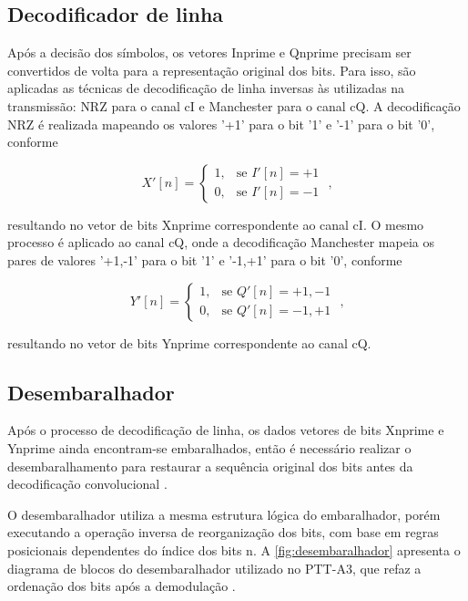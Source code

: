 \subsection{Decodificador de linha}

Após a decisão dos símbolos, os vetores \gls{Inprime} e \gls{Qnprime} precisam ser convertidos de volta para a representação original dos bits. Para isso, são aplicadas as técnicas de decodificação de linha inversas às utilizadas na transmissão: \gls{NRZ} para o canal \gls{cI} e \gls{Manchester} para o canal \gls{cQ}. A decodificação \gls{NRZ} é realizada mapeando os valores '+1' para o bit '1' e '-1' para o bit '0', conforme

\begin{equation}
    X'[n] = 
    \begin{cases}
    1, & \text{se } I'[n] = +1 \\
    0, & \text{se } I'[n] = -1
    \end{cases} \text{ ,}
\end{equation}


\noindent resultando no vetor de bits \gls{Xnprime} correspondente ao canal \gls{cI}. O mesmo processo é aplicado ao canal \gls{cQ}, onde a decodificação \gls{Manchester} mapeia os pares de valores '+1,-1' para o bit '1' e '-1,+1' para o bit '0', conforme

\begin{equation}
    Y'[n] = 
    \begin{cases}
    1, & \text{se } Q'[n] = +1,-1 \\
    0, & \text{se } Q'[n] = -1,+1
    \end{cases} \text{ ,}
\end{equation}

\noindent resultando no vetor de bits \gls{Ynprime} correspondente ao canal \gls{cQ}. 

\subsection{Desembaralhador}

Após o processo de decodificação de linha, os dados vetores de bits \gls{Xnprime} e \gls{Ynprime} ainda encontram-se embaralhados, então é necessário realizar o desembaralhamento para restaurar a sequência original dos bits antes da decodificação convolucional \cite{cnes_services_and_message_formats_ed2_rev2_2006}.

O desembaralhador utiliza a mesma estrutura lógica do embaralhador, porém executando a operação inversa de reorganização dos bits, com base em regras posicionais dependentes do índice dos bits \gls{n}. A \autoref{fig:desembaralhador} apresenta o diagrama de blocos do desembaralhador utilizado no \gls{PTT-A3}, que refaz a ordenação dos bits após a demodulação \cite{rodrigues_demodulador_2018}.

